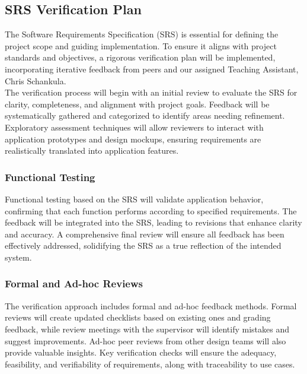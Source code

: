 \documentclass[12pt, titlepage]{article}
\begin{document}
\subsection{SRS Verification Plan}

The Software Requirements Specification (SRS) is essential for defining the
project scope and guiding implementation. To ensure it aligns with project
standards and objectives, a rigorous verification plan will be implemented,
incorporating iterative feedback from peers and our assigned Teaching Assistant,
Chris Schankula.\\
\newline
The verification process will begin with an initial review to evaluate the SRS
for clarity, completeness, and alignment with project goals. Feedback will be
systematically gathered and categorized to identify areas needing refinement.
Exploratory assessment techniques will allow reviewers to interact with
application prototypes and design mockups, ensuring requirements are
realistically translated into application features.

\subsubsection{Functional Testing}
Functional testing based on the SRS will validate application behavior,
confirming that each function performs according to specified requirements. The
feedback will be integrated into the SRS, leading to revisions that enhance
clarity and accuracy. A comprehensive final review will ensure all feedback has
been effectively addressed, solidifying the SRS as a true reflection of the
intended system.

\subsubsection{Formal and Ad-hoc Reviews}
The verification approach includes formal and ad-hoc feedback methods. Formal
reviews will create updated checklists based on existing ones and grading
feedback, while review meetings with the supervisor will identify mistakes and
suggest improvements. Ad-hoc peer reviews from other design teams will also
provide valuable insights. Key verification checks will ensure the adequacy,
feasibility, and verifiability of requirements, along with traceability to use
cases.
\end{document}
